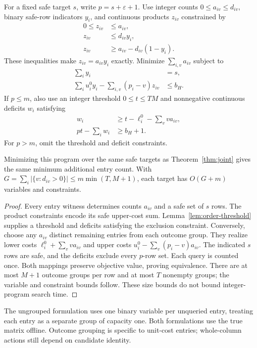 For a fixed safe target $s$, write $p=s+\varepsilon+1$. Use integer counts $0\le a_{iv}\le d_{iv}$, binary safe-row indicators $y_i$, and continuous products $z_{iv}$ constrained by
\begin{align*}
 0\le z_{iv}&\le a_{iv},\\
 z_{iv}&\le d_{iv}y_i,\\
 z_{iv}&\ge a_{iv}-d_{iv}(1-y_i).
\end{align*}
These inequalities make $z_{iv}=a_{iv}y_i$ exactly. Minimize $\sum_{i,v}a_{iv}$ subject to
\begin{align*}
 \sum_i y_i&=s,\\
 \sum_i u_i^0y_i-\sum_{i,v}(p_i-v)z_{iv}&\le b_H.
\end{align*}
If $p\le m$, also use an integer threshold $0\le t\le TM$ and nonnegative continuous deficits $w_i$ satisfying
\begin{align*}
 w_i&\ge t-\ell_i^0-\sum_v v a_{iv},\\
 pt-\sum_i w_i&\ge b_H+1.
\end{align*}
For $p>m$, omit the threshold and deficit constraints.

\begin{proposition}
\label{prop:compact-joint}
Minimizing this program over the same safe targets as Theorem~\ref{thm:joint} gives the same minimum additional entry count. With $G=\sum_i|\{v:d_{iv}>0\}|\le m\min(T,M+1)$, each target has $O(G+m)$ variables and constraints.
\end{proposition}
\begin{proof}
Every entry witness determines counts $a_{iv}$ and a safe set of $s$ rows. The product constraints encode its safe upper-cost sum. Lemma~\ref{lem:order-threshold} supplies a threshold and deficits satisfying the exclusion constraint. Conversely, choose any $a_{iv}$ distinct remaining entries from each outcome group. They realize lower costs $\ell_i^0+\sum_v v a_{iv}$ and upper costs $u_i^0-\sum_v(p_i-v)a_{iv}$. The indicated $s$ rows are safe, and the deficits exclude every $p$-row set. Each query is counted once. Both mappings preserve objective value, proving equivalence. There are at most $M+1$ outcome groups per row and at most $T$ nonempty groups; the variable and constraint bounds follow. These size bounds do not bound integer-program search time.
\end{proof}
The ungrouped formulation uses one binary variable per unqueried entry, treating each entry as a separate group of capacity one. Both formulations use the true matrix offline. Outcome grouping is specific to unit-cost entries; whole-column actions still depend on candidate identity.

